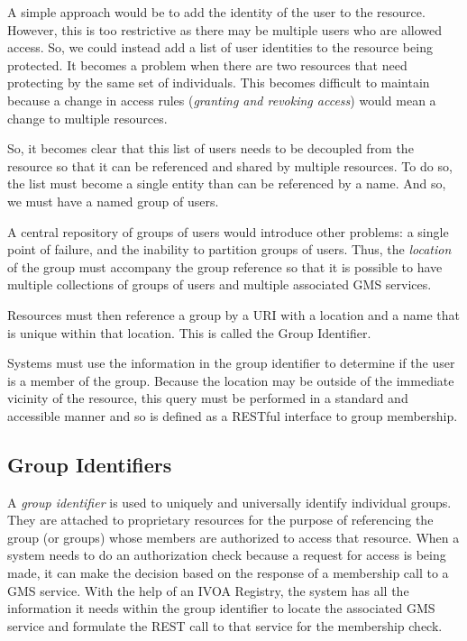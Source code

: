 \documentclass[11pt,a4paper]{ivoa}
\begin{document}
A simple approach would be to add the identity of the user to the resource.  However, this is too restrictive as there may be multiple users who are allowed access.  So, we could instead add a list of user identities to the resource being protected.  It becomes a problem when there are two resources that need protecting by the same set of individuals.  This becomes difficult to maintain because a change in access rules (\emph{granting and revoking access}) would mean a change to multiple resources.

So, it becomes clear that this list of users needs to be decoupled from the resource so that it can be referenced and shared by multiple resources.  To do so, the list must become a single entity than can be referenced by a name.  And so, we must have a named group of users.

A central repository of groups of users would introduce other problems:  a single point of failure, and the inability to partition groups of users.  Thus, the \emph{location} of the group must accompany the group reference so that it is possible to have multiple collections of groups of users and multiple associated GMS services.

Resources must then reference a group by a URI with a location and a name that is unique within that location.  This is called the Group Identifier.

Systems must use the information in the group identifier to determine if the user is a member of the group.  Because the location may be outside of the immediate vicinity of the resource, this query must be performed in a standard and accessible manner and so is defined as a RESTful interface to group membership.

\subsection{Group Identifiers}
\label{subsec:groupids}

A \emph{group identifier} is used to uniquely and universally identify individual groups.  They are attached to proprietary resources for the purpose of referencing the group (or groups) whose members are authorized to access that resource.  When a system needs to do an authorization check because a request for access is being made, it can make the decision based on the response of a membership call to a GMS service.  With the help of an IVOA Registry, the system has all the information it needs within the group identifier to locate the associated GMS service and formulate the REST call to that service for the membership check.
\end{document}
